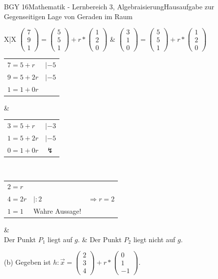 \documentclass[oneside,openany,headings=optiontotoc,11pt,numbers=noenddot]{scrreprt}
\begin{document}
\begin{worksheet}{BGY 16}{Mathematik - Lernbereich 3, Algebraisierung}{Hausaufgabe zur Gegenseitigen Lage von Geraden im Raum}
\begin{framed}
\begin{tabularx}{\textwidth}{X|X}
				\(\left(\begin{array}{c}7\\9\\1\end{array}\right) = \left(\begin{array}{c}5\\5\\1\end{array}\right) + r*\left(\begin{array}{c}1\\2\\0\end{array}\right)\) & \(\left(\begin{array}{c}3\\1\\0\end{array}\right) = \left(\begin{array}{c}5\\5\\1\end{array}\right) + r*\left(\begin{array}{c}1\\2\\0\end{array}\right)\)\\
				\par\noindent
				\begin{tabular}{ll}
					\(7=5 +r\) & \(| -5\)\\
					\(9=5+2r\) & \(|-5\)\\
					\(1=1+0r\) & 
				\end{tabular} &
				\begin{tabular}{ll}
					\(3=5 +r\) & \(| -3\)\\
					\(1=5+2r\) & \(|-5\)\\
					\(0=1+0r\) & \(\lightning\)
				\end{tabular}\\
				\begin{tabular}{lll}
					\(2=r\) \\
					\(4 = 2r\) & \(|:2\) & \(\Rightarrow r = 2\)\\
					\(1=1\) & Wahre Aussage!
				\end{tabular} & \\
				Der Punkt \(P_1\) liegt auf \(g\). & Der Punkt \(P_2\) liegt nicht auf \(g\).
			\end{tabularx}
			\newpage
			(b) Gegeben ist \(h:\vec{x} = \left(\begin{array}{c}2\\3\\4\end{array}\right) + r*\left(\begin{array}{c}0\\1\\-1\end{array}\right)\).\\

\end{framed}
\end{worksheet}
\end{document}
